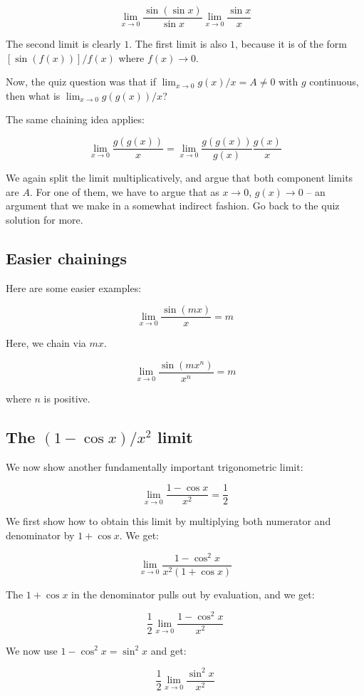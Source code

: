 \documentclass[10pt]{amsart}
\begin{document}
$$\lim_{x \to 0} \frac{\sin(\sin x)}{\sin x} \lim_{x \to 0} \frac{\sin x}{x}$$

The second limit is clearly $1$. The first limit is also $1$, because
it is of the form $[\sin(f(x))]/f(x)$ where $f(x) \to 0$.

Now, the quiz question was that if $\lim_{x \to 0} g(x)/x = A \ne 0$
with $g$ continuous, then what is $\lim_{x \to 0} g(g(x))/x$?

The same chaining idea applies:

$$\lim_{x \to 0} \frac{g(g(x))}{x} = \lim_{x \to 0} \frac{g(g(x))}{g(x)} \frac{g(x)}{x}$$

We again split the limit multiplicatively, and argue that both
component limits are $A$. For one of them, we have to argue that as $x
\to 0$, $g(x) \to 0$ -- an argument that we make in a somewhat
indirect fashion. Go back to the quiz solution for more.

\subsection{Easier chainings}

Here are some easier examples:

$$\lim_{x \to 0} \frac{\sin(mx)}{x} = m$$

Here, we chain via $mx$.

$$\lim_{x \to 0} \frac{\sin(mx^n)}{x^n} = m$$

where $n$ is positive.

\subsection{The $(1 - \cos x)/x^2$ limit}

We now show another fundamentally important trigonometric limit:

$$\lim_{x \to 0} \frac{1 - \cos x}{x^2} = \frac{1}{2}$$

We first show how to obtain this limit by multiplying both numerator
and denominator by $1 + \cos x$. We get:

$$\lim_{x \to 0} \frac{1 - \cos^2 x}{x^2(1 + \cos x)}$$

The $1 + \cos x$ in the denominator pulls out by evaluation, and we get:

$$\frac{1}{2} \lim_{x \to 0} \frac{1 - \cos^2 x}{x^2}$$

We now use $1 - \cos^2x = \sin^2x$ and get:

$$\frac{1}{2}\lim_{x \to 0} \frac{\sin^2x}{x^2}$$
\end{document}
